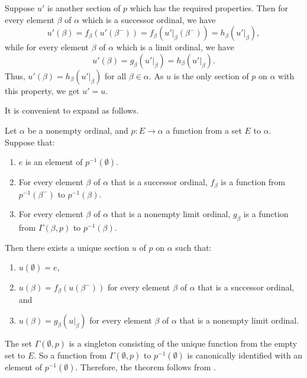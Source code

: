 \documentclass{article}
\begin{document}
Suppose \(u'\) is another section of \(p\) which has the required
properties.  Then for every element \(\beta\) of \(\alpha\) which is a
successor ordinal, we have
\begin{displaymath}
  u'(\beta) =
  f_\beta(u'(\beta^-)) =
  f_\beta(u' \vert_\beta(\beta^-)) =
  h_\beta(u' \vert_\beta),
\end{displaymath}
while for every element \(\beta\) of \(\alpha\) which is a limit
ordinal, we have
\begin{displaymath}
  u'(\beta) = g_\beta(u' \vert_\beta) = h_\beta(u' \vert_\beta).
\end{displaymath}
Thus, \(u'(\beta) = h_\beta(u' \vert_\beta)\) for all
\(\beta \in \alpha\).  As \(u\) is the only section of \(p\) on
\(\alpha\) with this property, we get \(u' = u\).

It is convenient to expand  as follows.

\begin{theorem}
  \label{thm:kfr9z94i}
  Let \(\alpha\) be a nonempty ordinal, and \(p : E \to \alpha\) a
  function from a set \(E\) to \(\alpha\).  Suppose that:
  \begin{enumerate}
  \item \(e\) is an element of \(p^{-1}(\emptyset)\).
  \item For every element \(\beta\) of \(\alpha\) that is a successor
    ordinal, \(f_\beta\) is a function from \(p^{-1}(\beta^-)\) to
    \(p^{-1}(\beta)\).
  \item For every element \(\beta\) of \(\alpha\) that is a nonempty
    limit ordinal, \(g_\beta\) is a function from \(\Gamma(\beta, p)\)
    to \(p^{-1}(\beta)\).
  \end{enumerate}
  Then there exists a unique section \(u\) of \(p\) on \(\alpha\) such
  that:
  \begin{enumerate}
  \item \(u(\emptyset) = e\),
  \item \(u(\beta) = f_\beta(u(\beta^-))\) for every element \(\beta\)
    of \(\alpha\) that is a successor ordinal, and
  \item \(u(\beta) = g_\beta(u \vert_\beta)\) for every element
    \(\beta\) of \(\alpha\) that is a nonempty limit ordinal.
  \end{enumerate}
\end{theorem}

The set \(\Gamma(\emptyset, p)\) is a singleton consisting of the
unique function from the empty set to \(E\).  So a function from
\(\Gamma(\emptyset, p)\) to \(p^{-1}(\emptyset)\) is canonically
identified with an element of \(p^{-1}(\emptyset)\).  Therefore, the
theorem follows from .
\end{document}
